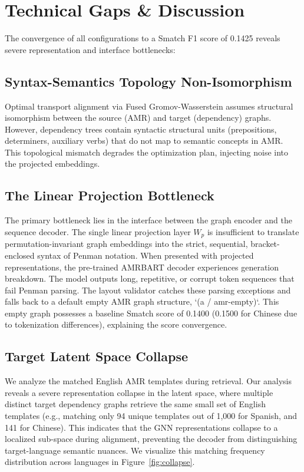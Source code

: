 \documentclass[11pt,a4paper,twocolumn]{article}
\begin{document}
\section{Technical Gaps \& Discussion}
\label{sec:discussion}
The convergence of all configurations to a Smatch F1 score of 0.1425 reveals severe representation and interface bottlenecks:

\subsection{Syntax-Semantics Topology Non-Isomorphism}
Optimal transport alignment via Fused Gromov-Wasserstein assumes structural isomorphism between the source (AMR) and target (dependency) graphs. However, dependency trees contain syntactic structural units (prepositions, determiners, auxiliary verbs) that do not map to semantic concepts in AMR. This topological mismatch degrades the optimization plan, injecting noise into the projected embeddings.

\subsection{The Linear Projection Bottleneck}
The primary bottleneck lies in the interface between the graph encoder and the sequence decoder. The single linear projection layer $W_p$ is insufficient to translate permutation-invariant graph embeddings into the strict, sequential, bracket-enclosed syntax of Penman notation. When presented with projected representations, the pre-trained AMRBART decoder experiences generation breakdown. The model outputs long, repetitive, or corrupt token sequences that fail Penman parsing. The layout validator catches these parsing exceptions and falls back to a default empty AMR graph structure, `(a / amr-empty)`. This empty graph possesses a baseline Smatch score of 0.1400 (0.1500 for Chinese due to tokenization differences), explaining the score convergence.

\subsection{Target Latent Space Collapse}
We analyze the matched English AMR templates during retrieval. Our analysis reveals a severe representation collapse in the latent space, where multiple distinct target dependency graphs retrieve the same small set of English templates (e.g., matching only 94 unique templates out of 1,000 for Spanish, and 141 for Chinese). This indicates that the GNN representations collapse to a localized sub-space during alignment, preventing the decoder from distinguishing target-language semantic nuances. We visualize this matching frequency distribution across languages in Figure~\ref{fig:collapse}.
\end{document}
